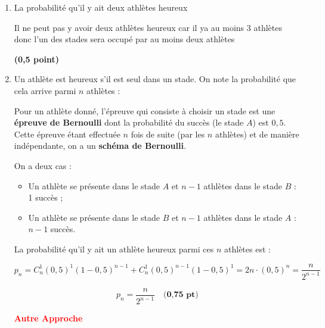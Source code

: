 \documentclass[12pt,a4paper]{article}
\begin{document}
\begin{enumerate}
    \item La probabilité qu’il y ait deux athlètes heureux

          Il ne peut pas y avoir deux athlètes heureux car il ya au moins 3 athlètes  donc l'un des stades sera occupé par au moins deux athlètes

          \begin{center}
              \fbox{\textcolor{red}{La probabilité qu'il y ait deux athlètes heureux est nulle}} \hfill \textbf{(0,5 point)}
          \end{center}

    \item Un athlète est heureux s’il est seul dans un stade. On note la probabilité que cela arrive parmi \( n \) athlètes :

          \noindent
          Pour un athlète donné, l’épreuve qui consiste à choisir un stade est une \textbf{épreuve de Bernoulli} dont la probabilité du succès (le stade \( A \)) est \( 0,5 \).\\
          Cette épreuve étant effectuée \( n \) fois de suite (par les \( n \) athlètes) et de manière indépendante, on a un \textbf{schéma de Bernoulli}.

          \vspace{0.2cm}
          \noindent
          On a deux cas :
          \begin{itemize}
              \item[\textbullet] Un athlète se présente dans le stade \( A \) et \( n - 1 \) athlètes dans le stade \( B \) : 1 succès ;
              \item[\textbullet] Un athlète se présente dans le stade \( B \) et \( n - 1 \) athlètes dans le stade \( A \) : \( n - 1 \) succès.
          \end{itemize}

          \vspace{0.2cm}
          \noindent
          La probabilité qu’il y ait un athlète heureux parmi ces \( n \) athlètes est :

          \[
              p_n = C_n^1 (0{,}5)^1 (1 - 0{,}5)^{n - 1} + C_n^1 (0{,}5)^{n - 1}(1 - 0{,}5)^1 = 2n \cdot (0{,}5)^n = \frac{n}{2^{n - 1}}
          \]

          \vspace{0.2cm}
          \[
              \boxed{p_n = \dfrac{n}{2^{n - 1}}} \quad \textbf{(0,75 pt)}
          \]


          \textcolor{red}{\textbf{Autre Approche}}


\end{enumerate}
\end{document}
